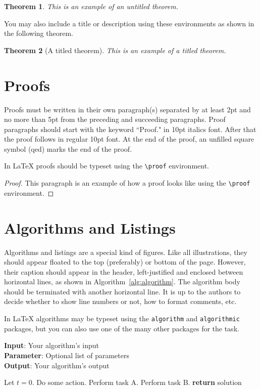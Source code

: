 \documentclass{article}
\newtheorem{theorem}{Theorem}
\begin{document}
\begin{theorem}
	This is an example of an untitled theorem.
\end{theorem}

You may also include a title or description using these environments as shown in the following theorem.

\begin{theorem}[A titled theorem]
	This is an example of a titled theorem.
\end{theorem}

\section{Proofs}

Proofs must be written in their own paragraph(s) separated by at least 2pt and no more than 5pt from the preceding and succeeding paragraphs. Proof paragraphs should start with the keyword ``Proof." in 10pt italics font. After that the proof follows in regular 10pt font. At the end of the proof, an unfilled square symbol (qed) marks the end of the proof.

In \LaTeX{} proofs should be typeset using the \texttt{\textbackslash{proof}} environment.

\begin{proof}
	This paragraph is an example of how a proof looks like using the \texttt{\textbackslash{proof}} environment.
\end{proof}


\section{Algorithms and Listings}

Algorithms and listings are a special kind of figures. Like all illustrations, they should appear floated to the top (preferably) or bottom of the page. However, their caption should appear in the header, left-justified and enclosed between horizontal lines, as shown in Algorithm~\ref{alg:algorithm}. The algorithm body should be terminated with another horizontal line. It is up to the authors to decide whether to show line numbers or not, how to format comments, etc.

In \LaTeX{} algorithms may be typeset using the {\tt algorithm} and {\tt algorithmic} packages, but you can also use one of the many other packages for the task.

\begin{algorithm}[tb]
	\caption{Example algorithm}
	\label{alg:algorithm}
	\textbf{Input}: Your algorithm's input\\
	\textbf{Parameter}: Optional list of parameters\\
	\textbf{Output}: Your algorithm's output
	\begin{algorithmic}[1] %
		\STATE Let $t=0$.
		\STATE Do some action.
		\STATE Perform task A.
		\ELSE
		\STATE Perform task B.
		\ENDIF
		\ENDWHILE
		\STATE \textbf{return} solution
	\end{algorithmic}
\end{algorithm}
\end{document}
